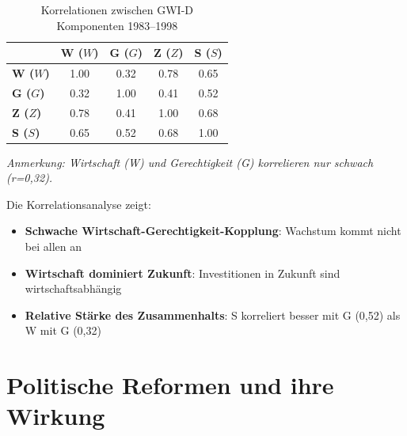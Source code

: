 \begin{table}[ht]
    \centering
    \caption{Korrelationen zwischen GWI-D Komponenten 1983–1998}
    \label{tab:korrelation_konsolidierung}
    \begin{tabular}{lcccc}
        \toprule
        & \textbf{W (\(W\))} & \textbf{G (\(G\))} & \textbf{Z (\(Z\))} & \textbf{S (\(S\))} \\
        \midrule
        \textbf{W (\(W\))} & 1.00 & 0.32 & 0.78 & 0.65 \\
        \textbf{G (\(G\))} & 0.32 & 1.00 & 0.41 & 0.52 \\
        \textbf{Z (\(Z\))} & 0.78 & 0.41 & 1.00 & 0.68 \\
        \textbf{S (\(S\))} & 0.65 & 0.52 & 0.68 & 1.00 \\
        \bottomrule
    \end{tabular}
\end{table}

\begin{flushleft}
\footnotesize{\textit{Anmerkung: Wirtschaft (W) und Gerechtigkeit (G) korrelieren nur schwach (r=0,32).}}
\end{flushleft}

Die Korrelationsanalyse zeigt:
\begin{itemize}
    \item \textbf{Schwache Wirtschaft-Gerechtigkeit-Kopplung}: Wachstum kommt nicht bei allen an
    \item \textbf{Wirtschaft dominiert Zukunft}: Investitionen in Zukunft sind wirtschaftsabhängig
    \item \textbf{Relative Stärke des Zusammenhalts}: S korreliert besser mit G (0,52) als W mit G (0,32)
\end{itemize}

\section{Politische Reformen und ihre Wirkung}


